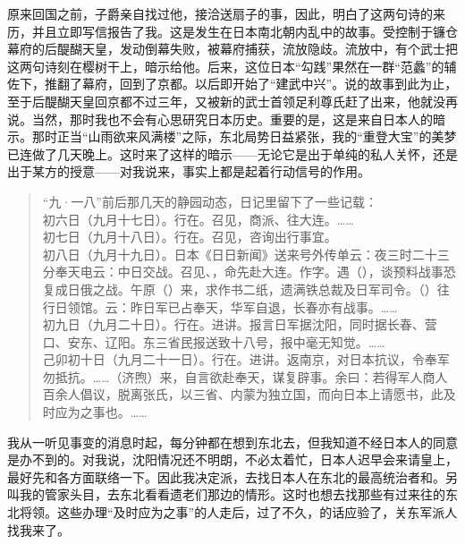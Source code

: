 原来回国之前，子爵亲自找过他，接洽送扇子的事，因此，明白了这两句诗的来历，并且立即写信报告了我。这是发生在日本南北朝内乱中的故事。受控制于镰仓幕府的后醍醐天皇，发动倒幕失败，被幕府捕获，流放隐歧。流放中，有个武士把这两句诗刻在樱树干上，暗示给他。后来，这位日本“勾践”果然在一群“范蠡”的辅佐下，推翻了幕府，回到了京都。以后即开始了“建武中兴”。说的故事到此为止，至于后醍醐天皇回京都不过三年，又被新的武士首领足利尊氏赶了出来，他就没再说。当然，那时我也不会有心思研究日本历史。重要的是，这是来自日本人的暗示。那时正当“山雨欲来风满楼”之际，东北局势日益紧张，我的“重登大宝”的美梦已连做了几天晚上。这时来了这样的暗示——无论它是出于单纯的私人关怀，还是出于某方的授意——对我说来，事实上都是起着行动信号的作用。\\

\begin{quote}
	“九·一八”前后那几天的静园动态，日记里留下了一些记载：\\

初六日（九月十七日）。行在。召见，商派、往大连。……\\

初七日（九月十八日）。行在。召见，咨询出行事宜。\\

初八日（九月十九日）。日本《日日新闻》送来号外传单云：夜三时二十三分奉天电云：中日交战。召见、，命先赴大连。作字。遇（），谈预料战事恐复成日俄之战。午原（）来，求作书二纸，遗满铁总裁及日军司令。（）往行日领馆。云：昨日军已占奉天，华军自退，长春亦有战事。……\\

初九日（九月二十日）。行在。进讲。报言日军据沈阳，同时据长春、营口、安东、辽阳。东三省民报送致十八号，报中毫无知觉。……\\

己卯初十日（九月二十一日）。行在。进讲。返南京，对日本抗议，令奉军勿抵抗。……（济煦）来，自言欲赴奉天，谋复辟事。余曰：若得军人商人百余人倡议，脱离张氏，以三省、内蒙为独立国，而向日本上请愿书，此及时应为之事也。……\\
\end{quote}

我从一听见事变的消息时起，每分钟都在想到东北去，但我知道不经日本人的同意是办不到的。对我说，沈阳情况还不明朗，不必太着忙，日本人迟早会来请皇上，最好先和各方面联络一下。因此我决定派，去找日本人在东北的最高统治者和。另叫我的管家头目，去东北看看遗老们那边的情形。这时也想去找那些有过来往的东北将领。这些办理“及时应为之事”的人走后，过了不久，的话应验了，关东军派人找我来了。\\

